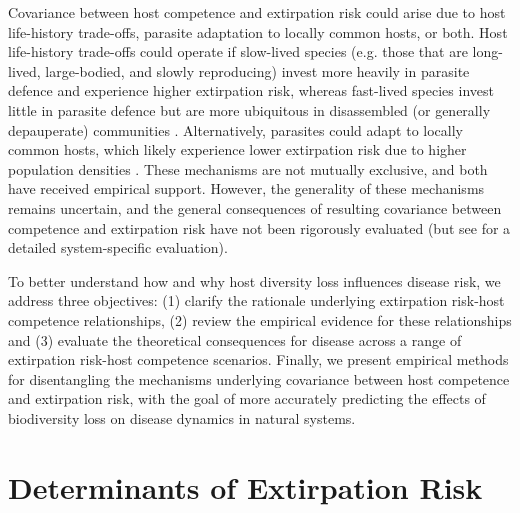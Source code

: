 Covariance between host competence and extirpation risk could arise due to host life-history trade-offs, parasite adaptation to locally common hosts, or both.
Host life-history trade-offs could operate if slow-lived species (e.g. those that are long-lived, large-bodied, and slowly reproducing) invest more heavily in parasite defence and experience higher extirpation risk, whereas fast-lived species invest little in parasite defence but are more ubiquitous in disassembled (or generally depauperate) communities \citep{Huang2013a}.
Alternatively, parasites could adapt to locally common hosts, which likely experience lower extirpation risk due to higher population densities \citep{Lively2000}.
These mechanisms are not mutually exclusive, and both have received empirical support.
However, the generality of these mechanisms remains uncertain, and the general consequences of resulting covariance between competence and extirpation risk have not been rigorously evaluated (but see \citet{Ostfeld2003} for a detailed system-specific evaluation).

To better understand how and why host diversity loss influences disease risk, we address three objectives: (1) clarify the rationale underlying extirpation risk-host competence relationships, (2) review the empirical evidence for these relationships and (3) evaluate the theoretical consequences for disease across a range of extirpation risk-host competence scenarios.
Finally, we present empirical methods for disentangling the mechanisms underlying covariance between host competence and extirpation risk, with the goal of more accurately predicting the effects of biodiversity loss on disease dynamics in natural systems.

\section{Determinants of Extirpation Risk}

